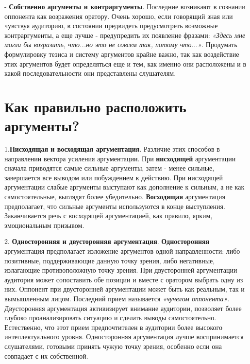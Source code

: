 - \textbf{Собственно аргументы и контраргументы}. Последние возникают в сознании оппонента как возражения оратору. Очень хорошо, если говорящий зная или чувствуя аудиторию, в состоянии предвидеть предусмотреть возможные контраргументы, а еще лучше - предупредить их появление фразами: \textit{«Здесь мне могли бы возразить, что...но это не совсем так, потому что...»}.
Продумать формулировку тезиса и систему аргументов крайне важно, так как воздействие этих аргументов будет определяться еще и тем, как именно они расположены и  в какой последовательности они представлены слушателям.

\chapter{\textbf{Как правильно расположить аргументы?}}

1.\textbf{Нисходящая и восходящая аргументация}.
Различие этих способов в направлении вектора усиления аргументации. При \textbf{нисходящей} аргументации сначала приводятся самые сильные аргументы, затем - менее сильные, завершается все выводом или побуждением к действию. При нисходящей аргументации слабые аргументы выступают как дополнение к сильным, а не как самостоятельные, выглядят более убедительно.
\textbf{Восходящая} аргументация предполагает, что сильные аргументы используются в конце выступления. Заканчивается речь с восходящей аргументацией, как правило, ярким, эмоциональным призывом.

2. \textbf{Односторонняя и двусторонняя аргументация}. \textbf{Односторонняя}  аргументация предполагает изложение аргументов одной направленности: либо позитивные, поддерживающие данную точку зрения, либо негативные, излагающие противоположную точку зрения. При двусторонней аргументации аудитория может сопоставить обе позиции и вместе с оратором выбрать одну из них. Оппонент при двусторонней аргументации может быть как реальным, так и вымышленным лицом. Последний прием называется \textit{«чучелом оппонента»}. Двусторонняя аргументация активизирует внимание аудитории, позволяет более глубоко проанализировать ситуацию и сделать выводы самостоятельно. Естественно, что этот прием предпочтителен в аудитории более высокого интеллектуального уровня. Односторонняя аргументация лучше воспринимается слушателями, готовыми принять чужую точку зрения, особенно если она совпадает с их собственной.

